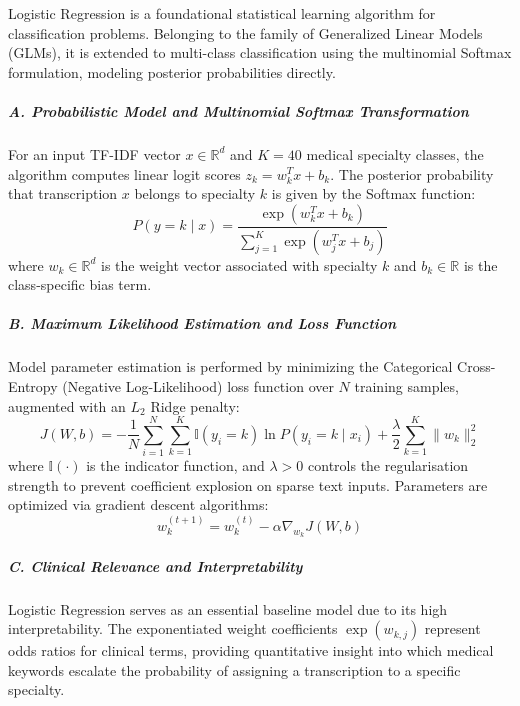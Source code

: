 Logistic Regression is a foundational statistical learning algorithm for classification problems. Belonging to the family of Generalized Linear Models (GLMs), it is extended to multi-class classification using the multinomial Softmax formulation, modeling posterior probabilities directly.

\subparagraph{A. Probabilistic Model and Multinomial Softmax Transformation}
For an input TF-IDF vector $x \in \mathbb{R}^d$ and $K = 40$ medical specialty classes, the algorithm computes linear logit scores $z_k = w_k^T x + b_k$. The posterior probability that transcription $x$ belongs to specialty $k$ is given by the Softmax function:
\begin{equation}
P(y = k \mid x) = \frac{\exp(w_k^T x + b_k)}{\sum_{j=1}^{K} \exp(w_j^T x + b_j)}
\end{equation}
where $w_k \in \mathbb{R}^d$ is the weight vector associated with specialty $k$ and $b_k \in \mathbb{R}$ is the class-specific bias term.

\subparagraph{B. Maximum Likelihood Estimation and Loss Function}
Model parameter estimation is performed by minimizing the Categorical Cross-Entropy (Negative Log-Likelihood) loss function over $N$ training samples, augmented with an $L_2$ Ridge penalty:
\begin{equation}
J(W, b) = -\frac{1}{N} \sum_{i=1}^{N} \sum_{k=1}^{K} \mathbb{I}(y_i = k) \ln P(y_i = k \mid x_i) + \frac{\lambda}{2} \sum_{k=1}^{K} \|w_k\|_2^2
\end{equation}
where $\mathbb{I}(\cdot)$ is the indicator function, and $\lambda > 0$ controls the regularisation strength to prevent coefficient explosion on sparse text inputs. Parameters are optimized via gradient descent algorithms:
\begin{equation}
w_k^{(t+1)} = w_k^{(t)} - \alpha \nabla_{w_k} J(W, b)
\end{equation}

\subparagraph{C. Clinical Relevance and Interpretability}
Logistic Regression serves as an essential baseline model due to its high interpretability. The exponentiated weight coefficients $\exp(w_{k, j})$ represent odds ratios for clinical terms, providing quantitative insight into which medical keywords escalate the probability of assigning a transcription to a specific specialty.

